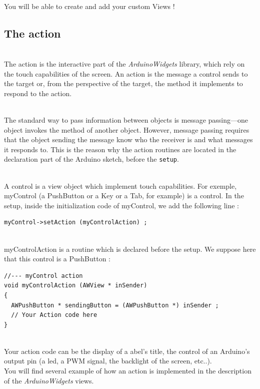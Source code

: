 \documentclass[a4paper,11pt]{extarticle}
\begin{document}
~\\ You will be able to create and add your custom Views !

\newpage
\subsection{The action}

~\\ The action is the interactive part of the \emph{ArduinoWidgets} library, which rely on the touch capabilities of the screen. An action is the message a control sends to the target or, from the perspective of the target, the method it implements to respond to the action. 

~\\The standard way to pass information between objects is message passing—one object invokes the method of another object. However, message passing requires that the object sending the message know who the receiver is and what messages it responds to. This is the reason why the action routines are located in the declaration part of the Arduino sketch, before the \texttt{setup}.

~\\ A control is a view object which implement touch capabilities. For exemple, myControl (a PushButton or a Key or a Tab, for example) is a control. In the setup, inside the initialization code of myControl, we add the following line :

\begin{lstlisting}[language=Arduinonl]
myControl->setAction (myControlAction) ;
\end{lstlisting}

~\\ myControlAction is a routine which is declared before the setup. We suppose here that this control is a PushButton :

\begin{lstlisting}[language=Arduinonl]
//--- myControl action
void myControlAction (AWView * inSender)
{
  AWPushButton * sendingButton = (AWPushButton *) inSender ;
  // Your Action code here
}
\end{lstlisting}

~\\ Your action code can be the display of a abel's title, the control of an Arduino's output pin (a led, a PWM signal, the backlight of the screen, etc..).
~\\ You will find several example of how an action is implemented in the description of the \emph{ArduinoWidgets} views.
\end{document}
